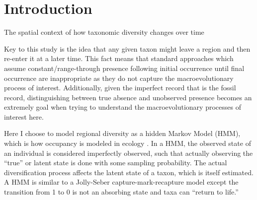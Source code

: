 \documentclass[12pt,letterpaper]{article}
\begin{document}
\section{Introduction}

The spatial context of how taxonomic diversity changes over time



Key to this study is the idea that any given taxon might leave a region and then re-enter it at a later time. This fact means that standard approaches which assume constant/range-through presence following initial occurrence until final occurrence \citep{Alroy2010c,Foote2003,Foote2000,Foote2000a,Smits2015,Liow2008,Liow2015,Silvestro2014a} are inappropriate as they do not capture the macroevolutionary process of interest. Additionally, given the imperfect record that is the fossil record, distinguishing between true absence and unobserved presence becomes an extremely goal when trying to understand the macroevolutionary processes of interest here.

Here I choose to model regional diversity as a hidden Markov Model (HMM), which is how occupancy is modeled in ecology \citep{Royle2008}. In a HMM, the observed state of an individual is considered imperfectly observed, such that actually observing the ``true'' or latent state is done with some sampling probability. The actual diversification process affects the latent state of a taxon, which is itself estimated. A HMM is similar to a Jolly-Seber capture-mark-recapture model \citep{Liow2015,Royle2008} except the transition from 1 to 0 is not an absorbing state and taxa can ``return to life.''
\end{document}
